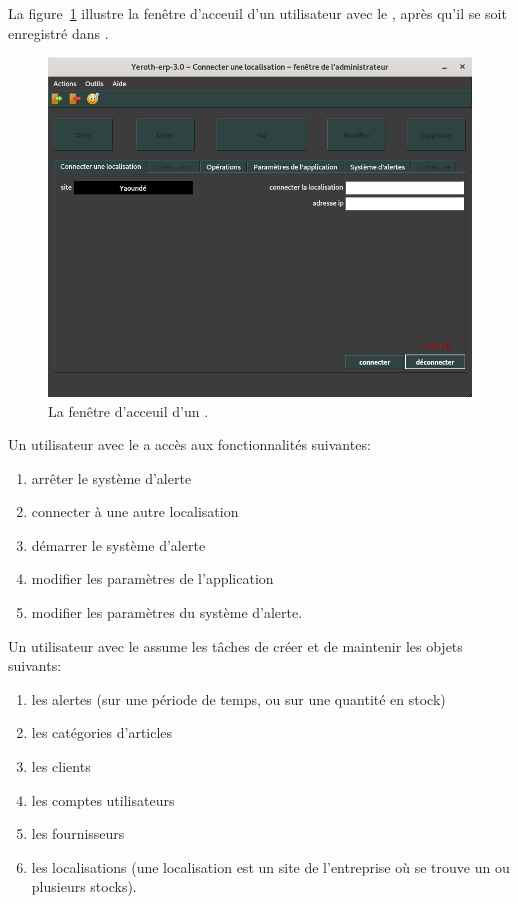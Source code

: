 \label{sec:utilisateurs-ladministrateur}

La figure~\ref{fig:fenetre-principale-admin} illustre la
fen\^etre d'acceuil d'un utilisateur avec le \role \admin,
apr\`es qu'il se soit enregistr\'e dans \yeren.\\

\begin{figure}[!htbp]
\centering
\includegraphics[scale=0.63]{images/yeroth-fenetre-administrateur.png}
\caption{La fen\^etre d'acceuil d'un \admin.}
\label{fig:fenetre-principale-admin}
\end{figure}

Un utilisateur avec le \role \admin a acc\`es aux
fonctionnalit\'es suivantes:
\begin{enumerate}[1)]
	\item arr\^eter le syst\`eme d'alerte
	\item connecter \yerenpos \`a une autre localisation
	\item d\'emarrer le syst\`eme d'alerte
	\item modifier les param\`etres de l'application
	\item modifier les param\`etres du syst\`eme d'alerte.\\   
\end{enumerate}

Un utilisateur avec le \role \admin assume les
t\^aches de cr\'eer et de maintenir les objets suivants:
\begin{enumerate}[1)]
	\item les alertes (sur une p\'eriode de temps, ou sur une quantit\'e en stock)
	\item les cat\'egories d'articles
	\item les clients
	\item les comptes utilisateurs
	\item les fournisseurs				
	\item les localisations (une localisation est un site de
	      l'entreprise o\`u se trouve un ou plusieurs stocks).\\   
\end{enumerate}
